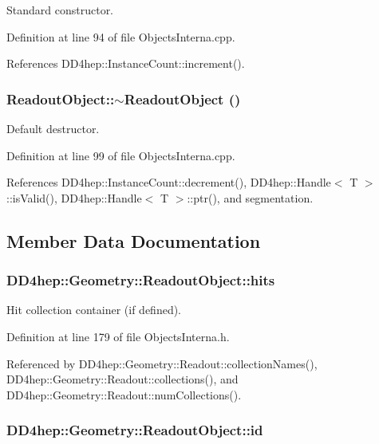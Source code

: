 Standard constructor. 

Definition at line 94 of file ObjectsInterna.cpp.

References DD4hep::InstanceCount::increment().\hypertarget{class_d_d4hep_1_1_geometry_1_1_readout_object_a5a3ba52dd04797f7b3125688d0496507}{
\subsubsection[{$\sim$ReadoutObject}]{\setlength{\rightskip}{0pt plus 5cm}ReadoutObject::$\sim$ReadoutObject ()}}
\label{class_d_d4hep_1_1_geometry_1_1_readout_object_a5a3ba52dd04797f7b3125688d0496507}


Default destructor. 

Definition at line 99 of file ObjectsInterna.cpp.

References DD4hep::InstanceCount::decrement(), DD4hep::Handle$<$ T $>$::isValid(), DD4hep::Handle$<$ T $>$::ptr(), and segmentation.

\subsection{Member Data Documentation}
\hypertarget{class_d_d4hep_1_1_geometry_1_1_readout_object_a07fe52ab89e2b0806f68da5eea1d8899}{
\subsubsection[{hits}]{ {\bf DD4hep::Geometry::ReadoutObject::hits}}}
\label{class_d_d4hep_1_1_geometry_1_1_readout_object_a07fe52ab89e2b0806f68da5eea1d8899}


Hit collection container (if defined). 

Definition at line 179 of file ObjectsInterna.h.

Referenced by DD4hep::Geometry::Readout::collectionNames(), DD4hep::Geometry::Readout::collections(), and DD4hep::Geometry::Readout::numCollections().\hypertarget{class_d_d4hep_1_1_geometry_1_1_readout_object_a46cd564f02d0c5c82382fe75f6bae2eb}{
\subsubsection[{id}]{ {\bf DD4hep::Geometry::ReadoutObject::id}}}
\label{class_d_d4hep_1_1_geometry_1_1_readout_object_a46cd564f02d0c5c82382fe75f6bae2eb}


